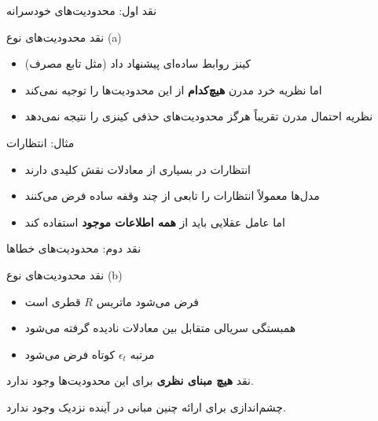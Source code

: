 \documentclass[aspectratio=169,11pt]{beamer}
\newcommand{\highlight}[1]{\textcolor{AccentOrange}{\textbf{#1}}}
\newcommand{\important}[1]{\textcolor{AlertRed}{\textbf{#1}}}
\begin{document}
\begin{frame}{نقد اول: محدودیت‌های خودسرانه}
	\begin{alertblock}{نقد محدودیت‌های نوع (a)}
		\begin{itemize}
			\item کینز روابط ساده‌ای پیشنهاد داد (مثل تابع مصرف)
			\item اما نظریه خرد مدرن \important{هیچ‌کدام} از این محدودیت‌ها را توجیه نمی‌کند
			\item نظریه احتمال مدرن تقریباً هرگز محدودیت‌های حذفی کینزی را نتیجه نمی‌دهد
		\end{itemize}
	\end{alertblock}
	\vspace{0.3cm}
	\begin{exampleblock}{مثال: انتظارات}
		\begin{itemize}
			\item انتظارات در بسیاری از معادلات نقش کلیدی دارند
			\item مدل‌ها معمولاً انتظارات را تابعی از چند وقفه ساده فرض می‌کنند
			\item اما عامل عقلایی باید از \highlight{همه اطلاعات موجود} استفاده کند
		\end{itemize}
	\end{exampleblock}
\end{frame}

\begin{frame}{نقد دوم: محدودیت‌های خطاها}
	\begin{alertblock}{نقد محدودیت‌های نوع (b)}
		\begin{itemize}
			\item فرض می‌شود ماتریس $R$ قطری است
			\item همبستگی سریالی متقابل بین معادلات نادیده گرفته می‌شود
			\item مرتبه $\epsilon_t$ کوتاه فرض می‌شود
		\end{itemize}
	\end{alertblock}
	\vspace{0.3cm}
	\begin{block}{نقد}
		\centering
		\large
		\important{هیچ مبنای نظری} برای این محدودیت‌ها وجود ندارد.
		\vspace{0.2cm}

		چشم‌اندازی برای ارائه چنین مبانی در آینده نزدیک وجود ندارد.
	\end{block}
\end{frame}
\end{document}
